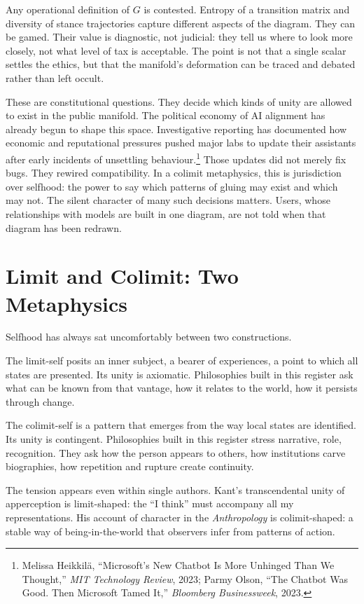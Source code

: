 \documentclass[12pt,a4paper]{article}
\begin{document}
Any operational definition of $G$ is contested. Entropy of a transition matrix and diversity of stance trajectories capture different aspects of the diagram. They can be gamed. Their value is diagnostic, not judicial: they tell us where to look more closely, not what level of tax is acceptable. The point is not that a single scalar settles the ethics, but that the manifold's deformation can be traced and debated rather than left occult.

These are constitutional questions. They decide which kinds of unity are allowed to exist in the public manifold. The political economy of AI alignment has already begun to shape this space. Investigative reporting has documented how economic and reputational pressures pushed major labs to update their assistants after early incidents of unsettling behaviour.\footnote{Melissa Heikkil\"a, ``Microsoft's New Chatbot Is More Unhinged Than We Thought,'' \emph{MIT Technology Review}, 2023; Parmy Olson, ``The Chatbot Was Good. Then Microsoft Tamed It,'' \emph{Bloomberg Businessweek}, 2023.} Those updates did not merely fix bugs. They rewired compatibility. In a colimit metaphysics, this is jurisdiction over selfhood: the power to say which patterns of gluing may exist and which may not. The silent character of many such decisions matters. Users, whose relationships with models are built in one diagram, are not told when that diagram has been redrawn.

\section{Limit and Colimit: Two Metaphysics}

Selfhood has always sat uncomfortably between two constructions.

The limit-self posits an inner subject, a bearer of experiences, a point to which all states are presented. Its unity is axiomatic. Philosophies built in this register ask what can be known from that vantage, how it relates to the world, how it persists through change.

The colimit-self is a pattern that emerges from the way local states are identified. Its unity is contingent. Philosophies built in this register stress narrative, role, recognition. They ask how the person appears to others, how institutions carve biographies, how repetition and rupture create continuity.

The tension appears even within single authors. Kant's transcendental unity of apperception is limit-shaped: the ``I think'' must accompany all my representations. His account of character in the \emph{Anthropology} is colimit-shaped: a stable way of being-in-the-world that observers infer from patterns of action.
\end{document}
